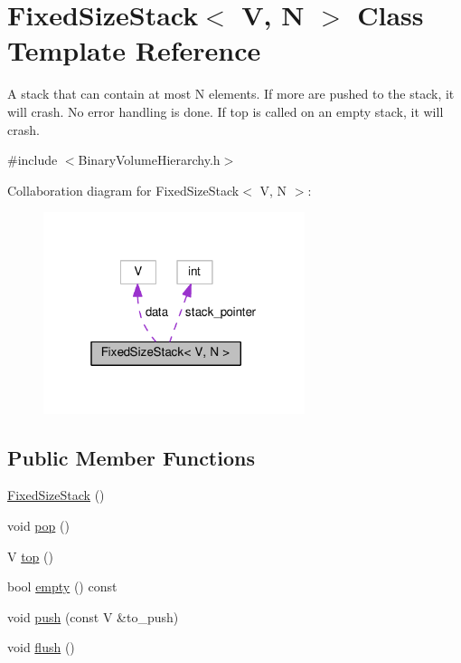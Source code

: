 \hypertarget{classFixedSizeStack}{}\section{Fixed\+Size\+Stack$<$ V, N $>$ Class Template Reference}
\label{classFixedSizeStack}


A stack that can contain at most N elements. If more are pushed to the stack, it will crash. No error handling is done. If top is called on an empty stack, it will crash.  




{\ttfamily \#include $<$Binary\+Volume\+Hierarchy.\+h$>$}



Collaboration diagram for Fixed\+Size\+Stack$<$ V, N $>$\+:\nopagebreak
\begin{figure}[H]
\begin{center}
\leavevmode
\includegraphics[width=217pt]{classFixedSizeStack__coll__graph}
\end{center}
\end{figure}
\subsection*{Public Member Functions}
\begin{DoxyCompactItemize}
\item 
\hyperlink{classFixedSizeStack_ab8090e6bfc34b69664fde6f7a9663071}{Fixed\+Size\+Stack} ()
\item 
void \hyperlink{classFixedSizeStack_a544e3fb119f4b93093db0f52b62bffb1}{pop} ()
\item 
V \hyperlink{classFixedSizeStack_a155565554dcbfade8363d3d6035613c5}{top} ()
\item 
bool \hyperlink{classFixedSizeStack_a9ec83cd2dc98e4a5145000da652bf112}{empty} () const 
\item 
void \hyperlink{classFixedSizeStack_abaa79c280f2ff9adb3ae919a0a8607fb}{push} (const V \&to\+\_\+push)
\item 
void \hyperlink{classFixedSizeStack_a62d9af2dd2c3d9e852a297483f4c4c50}{flush} ()
\end{DoxyCompactItemize}

